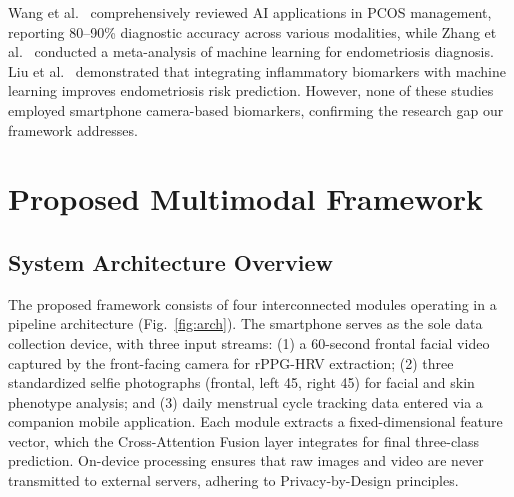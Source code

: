 \documentclass[conference]{IEEEtran}
\begin{document}
Wang et al.~\cite{Wang_2025} comprehensively reviewed AI applications in PCOS management, reporting 80--90\% diagnostic accuracy across various modalities, while Zhang et al.~\cite{Zhang_2026} conducted a meta-analysis of machine learning for endometriosis diagnosis. Liu et al.~\cite{Liu_2025} demonstrated that integrating inflammatory biomarkers with machine learning improves endometriosis risk prediction. However, none of these studies employed smartphone camera-based biomarkers, confirming the research gap our framework addresses.

\section{Proposed Multimodal Framework}

\subsection{System Architecture Overview}

The proposed framework consists of four interconnected modules operating in a pipeline architecture (Fig.~\ref{fig:arch}). The smartphone serves as the sole data collection device, with three input streams: (1) a 60-second frontal facial video captured by the front-facing camera for rPPG-HRV extraction; (2) three standardized selfie photographs (frontal, left 45\textdegree, right 45\textdegree) for facial and skin phenotype analysis; and (3) daily menstrual cycle tracking data entered via a companion mobile application. Each module extracts a fixed-dimensional feature vector, which the Cross-Attention Fusion layer integrates for final three-class prediction. On-device processing ensures that raw images and video are never transmitted to external servers, adhering to Privacy-by-Design principles.
\end{document}
